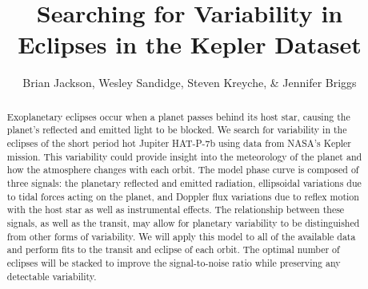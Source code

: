 \documentclass[manuscript]{aastex}
\begin{document}

\title{Searching for Variability in Eclipses in the Kepler Dataset}


\author{Brian Jackson, Wesley Sandidge, Steven Kreyche, \& Jennifer Briggs}




\begin{abstract}

Exoplanetary eclipses occur when a planet passes behind its host star, causing the planet’s reflected and emitted light to be blocked. We search for variability in the eclipses of the short period hot Jupiter HAT-P-7b using data from NASA’s Kepler mission. This variability could provide insight into the meteorology of the planet and how the atmosphere changes with each orbit. The model phase curve is composed of three signals: the planetary reflected and emitted radiation, ellipsoidal variations due to tidal forces acting on the planet, and Doppler flux variations due to reflex motion with the host star as well as instrumental effects. The relationship between these signals, as well as the transit, may allow for planetary variability to be distinguished from other forms of variability. We will apply this model to all of the available data and perform fits to the transit and eclipse of each orbit. The optimal number of eclipses will be stacked to improve the signal-to-noise ratio while preserving any detectable variability.

\end{abstract}
\end{document}
